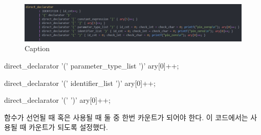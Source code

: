 \documentclass{article}
\begin{document}
\begin{figure}[h]
    \includegraphics[scale = 0.63]{function2.png}
    \caption{Caption}
\end{figure}
direct\_declarator '(' parameter\_type\_list ')' { ary[0]++; }

direct\_declarator '(' identifier\_list ')' { ary[0]++; }

direct\_declarator '(' ')' { ary[0]++; } 

함수가 선언될 때 혹은 사용될 때 둘 중 한번 카운트가 되어야 한다. 이 코드에서는 사용될 때 카운트가 되도록 설정했다.

\newpage
\end{document}
